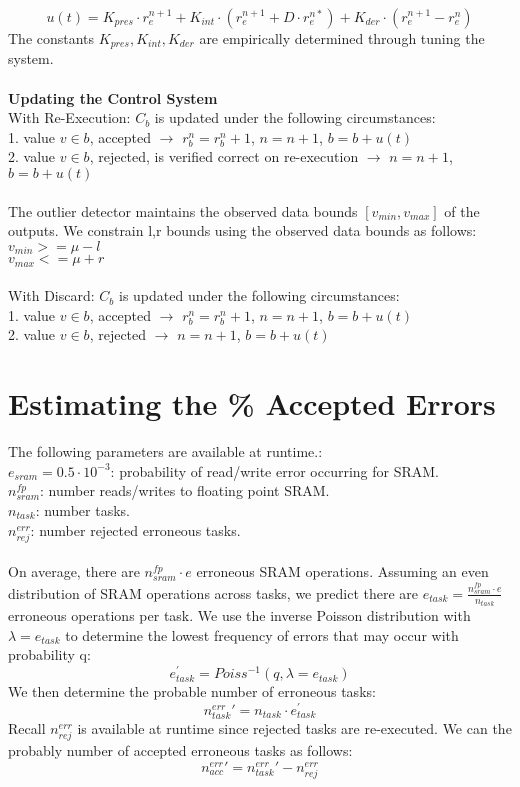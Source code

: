 \documentclass[11pt]{article}
\begin{document}
\[
	u(t) = K_{pres} \cdot r_e^{n+1} + K_{int} \cdot (r_e^{n+1} + D \cdot r_e^{n*}) + K_{der} \cdot(r_e^{n+1} - r_e^n)
\]
The constants $K_{pres}, K_{int}, K_{der}$ are empirically determined through tuning the system.\\\\
\textbf {Updating the Control System}\\
With Re-Execution: $C_b$ is updated under the following circumstances:\\
1. value $v \in b$, accepted $\rightarrow$ $r_b^n = r_b^n+1$, $n=n+1$, $b = b+u(t)$\\
2. value $v \in b$, rejected, is verified correct on re-execution $\rightarrow$ $n=n+1$, $b = b+u(t)$\\\\
The outlier detector maintains the observed data bounds $[v_{min}, v_{max}]$ of the outputs. We constrain l,r bounds using the observed data bounds as follows:\\
$v_{min} >= \mu - l$\\
$v_{max} <= \mu + r$\\\\
With Discard: $C_b$ is updated under the following circumstances:\\
1. value $v \in b$, accepted $\rightarrow$ $r_b^n = r_b^n+1$, $n=n+1$, $b = b+u(t)$\\
2. value $v \in b$, rejected $\rightarrow$ $n=n+1$, $b = b+u(t)$\\


\section {Estimating the \% Accepted Errors}
The following parameters are available at runtime.:\\
$e_{sram} = 0.5 \cdot 10^{-3}$: probability of read/write error occurring for SRAM.\\
$n_{sram}^{fp}$: number reads/writes to floating point SRAM.\\
$n_{task}$: number tasks.\\
$n_{rej}^{err}$: number rejected erroneous tasks.\\\\
On average, there are $n_{sram}^{fp} \cdot e$ erroneous SRAM operations. Assuming an even distribution of SRAM operations across tasks, we predict there are $e_{task} = \frac {n_{sram}^{fp} \cdot e} {n_{task}}$ erroneous operations per task. We use the inverse Poisson distribution with $\lambda = e_{task}$ to determine the lowest frequency of errors that may occur with probability q:
\[
	e_{task}^{\prime} = Poiss^{-1}(q, \lambda=e_{task})
\]
We then determine the probable number of erroneous tasks:
\[
n_{task}^{err}\prime = n_{task} \cdot e_{task}^{\prime}
\] 
Recall $n_{rej}^{err}$ is available at runtime since rejected tasks are re-executed. We can the probably number of accepted erroneous tasks as follows:
\[
	n_{acc}^{err}\prime = n_{task}^{err}\prime - n_{rej}^{err}
\]
\end{document}
